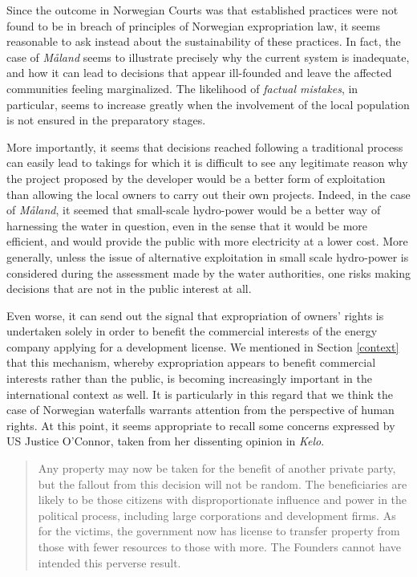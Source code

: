 Since the outcome in Norwegian Courts was that established practices were not found to be in breach of principles of Norwegian expropriation law, it seems reasonable to ask instead about the sustainability of these practices. In fact, the case of \emph{Måland} seems to illustrate precisely why the current system is inadequate, and how it can lead to decisions that appear ill-founded and leave the affected communities feeling marginalized. The likelihood of \emph{factual mistakes}, in particular, seems to increase greatly when the involvement of the local population is not ensured in the preparatory stages.

More importantly, it seems that decisions reached following a traditional process can easily lead to takings for which it is difficult to see any legitimate reason why the project proposed by the developer would be a better form of exploitation than allowing the local owners to carry out their own projects. Indeed, in the case of \emph{Måland}, it seemed that small-scale hydro-power would be a better way of harnessing the water in question, even in the sense that it would be more efficient, and would provide the public with more electricity at a lower cost. More generally, unless the issue of alternative exploitation in small scale hydro-power is considered during the assessment made by the water authorities, one risks making decisions that are not in the public interest at all. 

Even worse, it can send out the signal that expropriation of owners' rights is undertaken solely in order to benefit the commercial interests of the energy company applying for a development license. We mentioned in Section \ref{context} that this mechanism, whereby expropriation appears to benefit commercial interests rather than the public, is becoming increasingly important in the international context as well. It is particularly in this regard that we think the case of Norwegian waterfalls warrants attention from the perspective of human rights. At this point, it seems appropriate to recall some concerns expressed by US Justice O'Connor, taken from her dissenting opinion in \emph{Kelo}.

\begin{quote}
Any property may now be taken for the benefit of another private party, but the fallout from this decision will not be random. The beneficiaries are likely to be those citizens with disproportionate influence and power in the political process, including large corporations and development firms. As for the victims, the government now has license to transfer property from those with fewer resources to those with more. The Founders cannot have intended this perverse result.
\end{quote}

